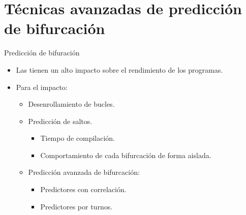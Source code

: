 \section{Técnicas avanzadas de predicción de bifurcación}

\begin{frame}[t]{Predicción de bifuración}
\begin{itemize}
  \item Las  tienen un alto impacto sobre 
        el rendimiento de los programas.

  \item Para  el impacto:
    \begin{itemize}
      \item Desenrollamiento de bucles.
      \item Predicción de saltos.
        \begin{itemize}
          \item Tiempo de compilación.
          \item Comportamiento de cada bifurcación de forma aislada.
        \end{itemize}
      \item Predicción avanzada de bifurcación:
        \begin{itemize}
          \item Predictores con correlación.
          \item Predictores por turnos.
        \end{itemize}
    \end{itemize}
\end{itemize}
\end{frame}

